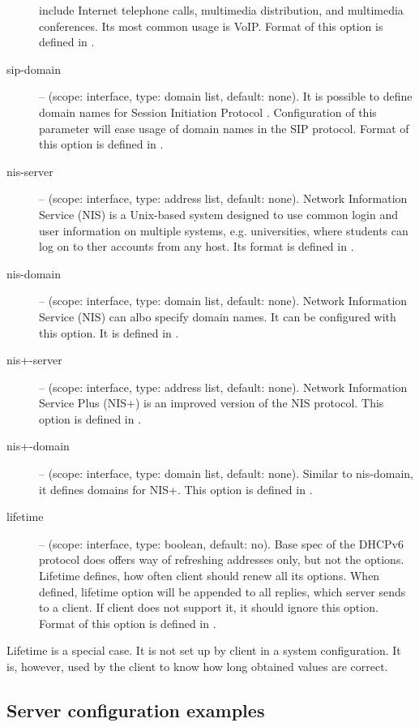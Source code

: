 \begin{description}
	    include Internet telephone calls, multimedia distribution,
	    and multimedia conferences. Its most common usage is
	    VoIP. Format of this option is defined in \cite{rfc3319}.
 \item[sip-domain] -- (scope: interface, type: domain list, default:
	    none). It is possible to define domain names for Session
	    Initiation Protocol \cite{rfc3263}. Configuration of this
	    parameter will ease usage of domain names in the SIP
	    protocol. Format of this option is defined in
	    \cite{rfc3319}.
 \item[nis-server] -- (scope: interface, type: address list, default:
	    none). Network Information Service (NIS) is a Unix-based
	    system designed to use common login and user information on
	    multiple systems, e.g. universities, where students can log
	    on to ther accounts from any host. Its format is defined
            in \cite{rfc3898}.
 \item[nis-domain] -- (scope: interface, type: domain list, default:
	    none). Network Information Service (NIS) can albo specify
	    domain names. It can be configured with this option. It is
	    defined in \cite{rfc3898}.
 \item[nis+-server] -- (scope: interface, type: address list, default:
	    none). Network Information Service Plus (NIS+) is an
	    improved version of the NIS protocol. This option is defined
	    in \cite{rfc3898}.
 \item[nis+-domain] -- (scope: interface, type: domain list, default:
	    none). Similar to nis-domain, it defines domains for
	    NIS+. This option is defined in \cite{rfc3898}.
 \item[lifetime] -- (scope: interface, type: boolean, default: no). Base
	    spec of the DHCPv6 protocol does offers way of refreshing
	    addresses only, but not the options. Lifetime defines, how
	    often client should renew all its options. When defined,
            lifetime option will be appended to all replies, which
            server sends to a client. If client does not support it,
            it should ignore this option. Format of
	    this option is defined in \cite{draft-lifetime}.
\end{description}

Lifetime is a special case. It is not set up by client in a system
configuration. It is, however, used by the client to know how long
obtained values are correct.

\subsection{Server configuration examples}

